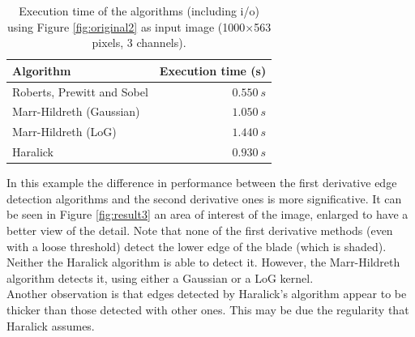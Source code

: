 \documentclass{ipol}
\numberwithin{equation}{section}
\numberwithin{table}{section}
\numberwithin{figure}{section}
\begin{document}
\begin{table}[h!]
	\begin{center}
	\begin{tabular}{| l | r |}
		\hline \rule{0pt}{3ex}
		\cellcolor[gray]{0.8} \textbf{Algorithm}	& \cellcolor[gray]{0.8} \textbf{Execution time (s)}	\\ \hline \rule{0pt}{3ex}
		Roberts, Prewitt and Sobel					& $0.550 \ s$										\\ \hline \rule{0pt}{3ex}
		Marr-Hildreth (Gaussian)					& $1.050 \ s$										\\ \hline \rule{0pt}{3ex}
		Marr-Hildreth (LoG)							& $1.440 \ s$										\\ \hline \rule{0pt}{3ex}
		Haralick									& $0.930 \ s$										\\
		\hline
	\end{tabular}
	\end{center}
	\caption{Execution time of the algorithms (including i/o) using Figure \ref{fig:original2} as input image (1000$\times$563 pixels, 3 channels).}
	\label{exectime2}
\end{table}

In this example the difference in performance between the first derivative edge detection algorithms and the second derivative ones is more significative. It can be seen in Figure \ref{fig:result3} an area of ​​interest of the image, enlarged to have a better view of the detail. Note that none of the first derivative methods (even with a loose threshold) detect the lower edge of the blade (which is shaded). Neither the Haralick algorithm is able to detect it. However, the Marr-Hildreth algorithm detects it, using either a Gaussian or a LoG kernel. \\

Another observation is that edges detected by Haralick's algorithm appear to be thicker than those detected with other ones. This may be due the regularity that Haralick assumes. \\
\end{document}
